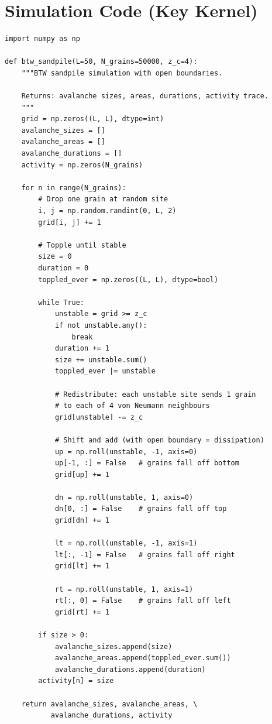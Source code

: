 \documentclass[preprint,12pt]{elsarticle}
\begin{document}



\appendix
\section{Simulation Code (Key Kernel)}
\label{app:code}

\begin{small}
\begin{verbatim}
import numpy as np

def btw_sandpile(L=50, N_grains=50000, z_c=4):
    """BTW sandpile simulation with open boundaries.
    
    Returns: avalanche sizes, areas, durations, activity trace.
    """
    grid = np.zeros((L, L), dtype=int)
    avalanche_sizes = []
    avalanche_areas = []
    avalanche_durations = []
    activity = np.zeros(N_grains)
    
    for n in range(N_grains):
        # Drop one grain at random site
        i, j = np.random.randint(0, L, 2)
        grid[i, j] += 1
        
        # Topple until stable
        size = 0
        duration = 0
        toppled_ever = np.zeros((L, L), dtype=bool)
        
        while True:
            unstable = grid >= z_c
            if not unstable.any():
                break
            duration += 1
            size += unstable.sum()
            toppled_ever |= unstable
            
            # Redistribute: each unstable site sends 1 grain
            # to each of 4 von Neumann neighbours
            grid[unstable] -= z_c
            
            # Shift and add (with open boundary = dissipation)
            up = np.roll(unstable, -1, axis=0)
            up[-1, :] = False   # grains fall off bottom
            grid[up] += 1
            
            dn = np.roll(unstable, 1, axis=0)
            dn[0, :] = False    # grains fall off top
            grid[dn] += 1
            
            lt = np.roll(unstable, -1, axis=1)
            lt[:, -1] = False   # grains fall off right
            grid[lt] += 1
            
            rt = np.roll(unstable, 1, axis=1)
            rt[:, 0] = False    # grains fall off left
            grid[rt] += 1
        
        if size > 0:
            avalanche_sizes.append(size)
            avalanche_areas.append(toppled_ever.sum())
            avalanche_durations.append(duration)
        activity[n] = size
    
    return avalanche_sizes, avalanche_areas, \
           avalanche_durations, activity
\end{verbatim}
\end{small}
\end{document}
